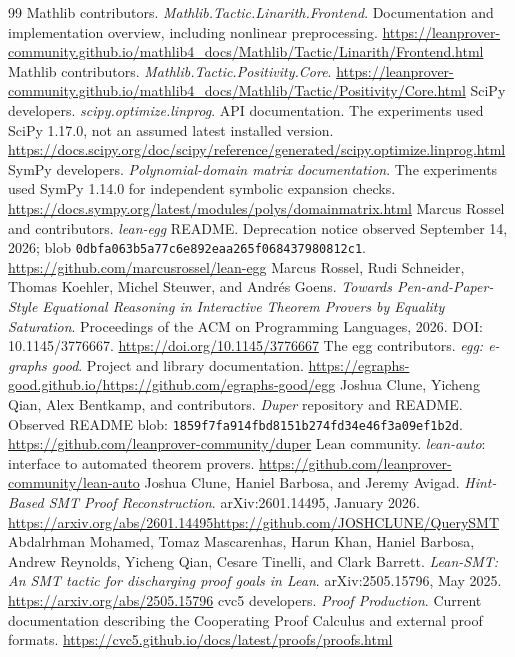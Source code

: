 \documentclass[11pt,a4paper]{article}
\begin{document}
\begin{thebibliography}{99}
 Mathlib contributors. \emph{Mathlib.Tactic.Linarith.Frontend}. Documentation and implementation overview, including nonlinear preprocessing. \url{https://leanprover-community.github.io/mathlib4_docs/Mathlib/Tactic/Linarith/Frontend.html}
 Mathlib contributors. \emph{Mathlib.Tactic.Positivity.Core}. \url{https://leanprover-community.github.io/mathlib4_docs/Mathlib/Tactic/Positivity/Core.html}
 SciPy developers. \emph{scipy.optimize.linprog}. API documentation. The experiments used SciPy 1.17.0, not an assumed latest installed version. \url{https://docs.scipy.org/doc/scipy/reference/generated/scipy.optimize.linprog.html}
 SymPy developers. \emph{Polynomial-domain matrix documentation}. The experiments used SymPy 1.14.0 for independent symbolic expansion checks. \url{https://docs.sympy.org/latest/modules/polys/domainmatrix.html}
 Marcus Rossel and contributors. \emph{lean-egg} README. Deprecation notice observed September 14, 2026; blob \texttt{0dbfa063b5a77c6e892eaa265f068437980812c1}. \url{https://github.com/marcusrossel/lean-egg}
 Marcus Rossel, Rudi Schneider, Thomas Koehler, Michel Steuwer, and Andrés Goens. \emph{Towards Pen-and-Paper-Style Equational Reasoning in Interactive Theorem Provers by Equality Saturation}. Proceedings of the ACM on Programming Languages, 2026. DOI: 10.1145/3776667. \url{https://doi.org/10.1145/3776667}
 The egg contributors. \emph{egg: e-graphs good}. Project and library documentation. \url{https://egraphs-good.github.io/}\quad\url{https://github.com/egraphs-good/egg}
 Joshua Clune, Yicheng Qian, Alex Bentkamp, and contributors. \emph{Duper} repository and README. Observed README blob: \texttt{1859f7fa914fbd8151b274fd34e46f3a09ef1b2d}. \url{https://github.com/leanprover-community/duper}
 Lean community. \emph{lean-auto}: interface to automated theorem provers. \url{https://github.com/leanprover-community/lean-auto}
 Joshua Clune, Haniel Barbosa, and Jeremy Avigad. \emph{Hint-Based SMT Proof Reconstruction}. arXiv:2601.14495, January 2026. \url{https://arxiv.org/abs/2601.14495}\quad\url{https://github.com/JOSHCLUNE/QuerySMT}
 Abdalrhman Mohamed, Tomaz Mascarenhas, Harun Khan, Haniel Barbosa, Andrew Reynolds, Yicheng Qian, Cesare Tinelli, and Clark Barrett. \emph{Lean-SMT: An SMT tactic for discharging proof goals in Lean}. arXiv:2505.15796, May 2025. \url{https://arxiv.org/abs/2505.15796}
 cvc5 developers. \emph{Proof Production}. Current documentation describing the Cooperating Proof Calculus and external proof formats. \url{https://cvc5.github.io/docs/latest/proofs/proofs.html}
\end{thebibliography}
\end{document}
